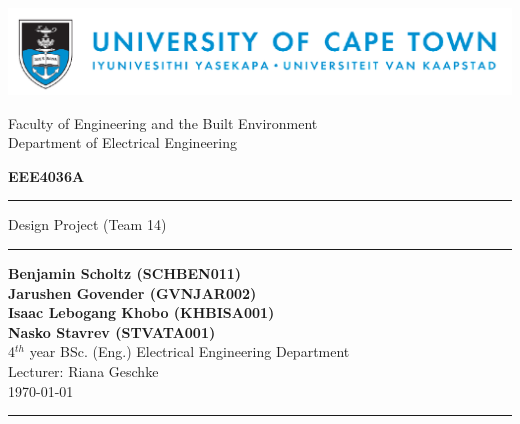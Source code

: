 \newcommand{\homedir}{/home/bscholtz/workspace/workspace-latex/2016-Design-Project/LATEX/}



\newcommand{\coursecode}{EEE4036A}
\newcommand{\assignment}{Design Project (Team 14)}
\newcommand{\lecturer}{Riana Geschke}

\pagestyle{fancy}
\fancyhf{}
\cfoot{\thepage}



\begin{titlepage} 
\includegraphics[width = 17cm]{images/uctbanner.png} \\

\begin{center}
\begin{LARGE}
Faculty of Engineering and the Built Environment \\
Department of Electrical Engineering \\
\end{LARGE}
\end{center}

\begin{center}  
\begin{Huge}
\textbf{\coursecode}\\
\bigskip
\bigskip
\hrule
\assignment \\
\end{Huge}

\vspace*{\fill}

\hrule
\begin{center}
\textbf{Benjamin Scholtz (SCHBEN011)\\
Jarushen Govender (GVNJAR002)\\
Isaac Lebogang Khobo (KHBISA001)\\
Nasko Stavrev (STVATA001)\\}
4$^{th}$ year BSc. (Eng.) Electrical Engineering Department\\
Lecturer: \lecturer \\
\today
\end{center}
\bigskip
\hrule

\end{center}
\end{titlepage}

